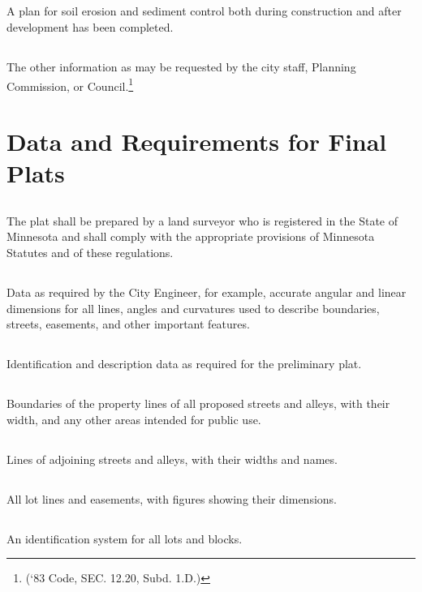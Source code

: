 \subsection{}
A plan for soil erosion and sediment control both during construction and after development has been completed.
\subsection{}
The other information as may be requested by the city staff, Planning Commission, or Council.\footnote{(‘83 Code, SEC. 12.20, Subd. 1.D.)}
\section{Data and Requirements for Final Plats}
\subsection{}
The plat shall be prepared by a land surveyor who is registered in the State of Minnesota and shall comply with the appropriate provisions of Minnesota Statutes and of these regulations.
\subsection{}
Data as required by the City Engineer, for example, accurate angular and linear dimensions for all lines, angles and curvatures used to describe boundaries, streets, easements, and other important features.
\subsection{}
Identification and description data as required for the preliminary plat.
\subsection{}
Boundaries of the property lines of all proposed streets and alleys, with their width, and any other areas intended for public use.
\subsection{}
Lines of adjoining streets and alleys, with their widths and names.
\subsection{}
All lot lines and easements, with figures showing their dimensions.
\subsection{}
An identification system for all lots and blocks.
